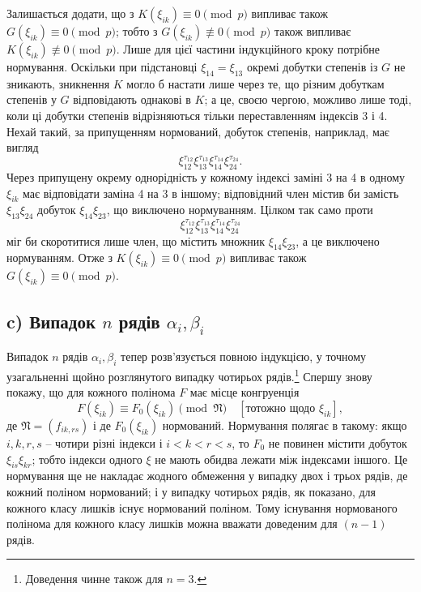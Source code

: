 \documentclass[11pt]{article}
\providecommand{\frN}{\mathfrak N}
\begin{document}
Залишається додати, що з \(K(\xi_{ik})\equiv0\pmod p\) випливає також \(G(\xi_{ik})\equiv0\pmod p\); тобто з \(G(\xi_{ik})\not\equiv0\pmod p\) також випливає \(K(\xi_{ik})\not\equiv0\pmod p\). Лише для цієї частини індукційного кроку потрібне нормування. Оскільки при підстановці \(\xi_{14}=\xi_{13}\) окремі добутки степенів із \(G\) не зникають, зникнення \(K\) могло б настати лише через те, що різним добуткам степенів у \(G\) відповідають однакові в \(K\); а це, своєю чергою, можливо лише тоді, коли ці добутки степенів відрізняються тільки переставленням індексів 3 і 4. Нехай такий, за припущенням нормований, добуток степенів, наприклад, має вигляд
\[
        \xi_{12}^{\tau_{12}}\xi_{13}^{\tau_{13}}\xi_{14}^{\tau_{14}}\xi_{24}^{\tau_{24}}.
\]
Через припущену окрему однорідність у кожному індексі заміні 3 на 4 в одному \(\xi_{ik}\) має відповідати заміна 4 на 3 в іншому; відповідний член містив би замість \(\xi_{13}\xi_{24}\) добуток \(\xi_{14}\xi_{23}\), що виключено нормуванням. Цілком так само проти
\[
        \xi_{12}^{\tau_{12}}\xi_{13}^{\tau_{13}}\xi_{14}^{\tau_{14}}\xi_{24}^{\tau_{24}}
\]
міг би скоротитися лише член, що містить множник \(\xi_{14}\xi_{23}\), а це виключено нормуванням. Отже з \(K(\xi_{ik})\equiv0\pmod p\) випливає також \(G(\xi_{ik})\equiv0\pmod p\).

\subsection*{c) Випадок \(n\) рядів \(\alpha_i,\beta_i\)}

Випадок \(n\) рядів \(\alpha_i,\beta_i\) тепер розв'язується повною індукцією, у точному узагальненні щойно розглянутого випадку чотирьох рядів.\footnote{Доведення чинне також для \(n=3\).}
Спершу знову покажу, що для кожного полінома \(F\) має місце конгруенція
\begin{equation}
        F(\xi_{ik})\equiv F_0(\xi_{ik})\pmod{\frN}\quad [\text{тотожно щодо \(\xi_{ik}\)}],
\end{equation}
де \(\frN=(f_{ik,rs})\) і де \(F_0(\xi_{ik})\) нормований. Нормування полягає в такому: якщо \(i,k,r,s\) -- чотири різні індекси і \(i<k<r<s\), то \(F_0\) не повинен містити добуток \(\xi_{is}\xi_{kr}\); тобто індекси одного \(\xi\) не мають обидва лежати між індексами іншого. Це нормування ще не накладає жодного обмеження у випадку двох і трьох рядів, де кожний поліном нормований; і у випадку чотирьох рядів, як показано, для кожного класу лишків існує нормований поліном. Тому існування нормованого полінома для кожного класу лишків можна вважати доведеним для \((n-1)\) рядів.
\end{document}
